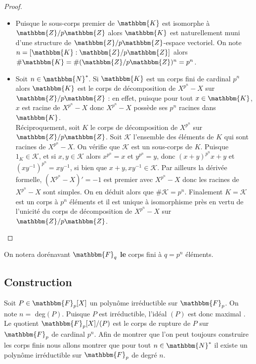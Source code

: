 \documentclass[12pt]{article}
\newcommand{\N}{\mathbbm{N}}
\newcommand{\Z}{\mathbbm{Z}}
\newcommand{\K}{\mathbbm{K}}
\newcommand{\F}{\mathbbm{F}}
\theoremstyle{definition}
\begin{document}
\begin{proof}\hspace{12pt}
\begin{itemize}
\item Puisque le sous-corps premier de $\K$ est isomorphe à $\Z / p \Z$ alors $\K$ est naturellement muni d'une structure de $\Z / p \Z$-espace vectoriel. On note $n = [ \K : \Z / p \Z ]$ alors $\# \K = \# (\Z / p \Z)^n = p^n$.
\item Soit $n \in \N^{*}$. Si $\K$ est un corps fini de cardinal $p^n$ alors $\K$ est le corps de décomposition de $X^{p^n} - X$ sur $\Z / p \Z$ : en effet, puisque pour tout $x \in \K$, $x$ est racine de $X^{p^n} - X$ donc $X^{p^n} - X$ possède ses $p^n$ racines dans $\K$.\\
Réciproquement, soit $K$ le corps de décomposition de $X^{p^n}$ sur $\Z / p \Z$. Soit $\mathcal{K}$ l'ensemble des éléments de $K$ qui sont racines de $X^{p^n} - X$. On vérifie que $\mathcal{K}$ est un sous-corps de $K$. Puisque $1_K \in \mathcal{K}$, et si $x,y \in \mathcal{K}$ alors $x^{p^n}= x$ et $y^{p^n} = y$, donc $(x+y)^{p^n} x + y$ et $(xy^{-1})^{p^n} = xy^{-1}$, si bien que $x + y, xy^{-1} \in \mathcal{K}$. Par ailleurs la dérivée formelle, $(X^{p^n} - X)' = -1$ est premier avec $X^{p^n} - X$ donc les racines de $X^{p^n} - X$ sont simples. On en déduit alors que $\# \mathcal{K} = p^n$. Finalement $K = \mathcal{K}$ est un corps à $p^n$ éléments et il est unique à isomorphisme près en vertu de l'unicité du corps de décomposition de $X^{p^n} - X$ sur $\Z / p \Z$.
\end{itemize}
\end{proof}
On notera dorénavant $\F_q$ \textbf{le} corps fini à $q = p^n$ éléments.
\subsection{Construction}
Soit $P \in \F_p [X]$ un polynôme irréductible sur $\F_p$. On note $n = $ deg$(P)$. Puisque $P$ est irréductible, l'idéal $(P)$ est donc maximal%
. Le quotient $\F_p [X] / (P)$ est le corps de rupture de $P$ sur $\F_p$ de cardinal $p^n$. Afin de montrer que l'on peut toujours construire les corps finis nous allons montrer que pour tout $n \in \N^{*}$ il existe un polynôme irréductible sur $\F_p$ de degré $n$.
\end{document}
